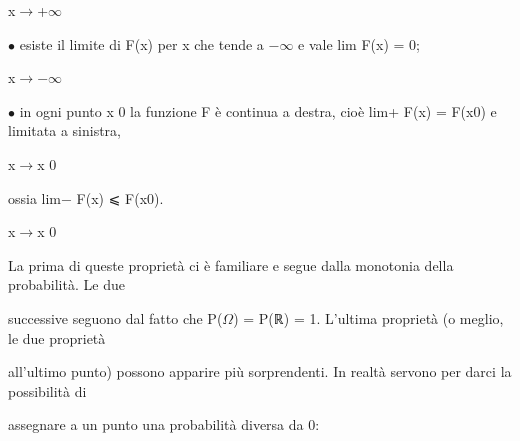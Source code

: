 \documentclass[a4paper,portrait,12pt]{article}
\begin{document}
\begin{flushleft}
x$\rightarrow$+$\infty$
\end{flushleft}





\begin{flushleft}
$\bullet$ esiste il limite di F(x) per x che tende a $-$$\infty$ e vale lim F(x) = 0;
\end{flushleft}


\begin{flushleft}
x$\rightarrow$$-$$\infty$
\end{flushleft}





\begin{flushleft}
$\bullet$ in ogni punto x 0 la funzione F \`{e} continua a destra, cio\`{e} lim+ F(x) = F(x0) e limitata a sinistra,
\end{flushleft}


\begin{flushleft}
x$\rightarrow$x 0
\end{flushleft}


\begin{flushleft}
ossia lim$-$ F(x) ⩽ F(x0).
\end{flushleft}


\begin{flushleft}
x$\rightarrow$x 0
\end{flushleft}





\begin{flushleft}
La prima di queste propriet\`{a} ci \`{e} familiare e segue dalla monotonia della probabilit\`{a}. Le due
\end{flushleft}


\begin{flushleft}
successive seguono dal fatto che P($\Omega$) = P(ℝ) = 1. L'ultima propriet\`{a} (o meglio, le due propriet\`{a}
\end{flushleft}


\begin{flushleft}
all'ultimo punto) possono apparire più sorprendenti. In realt\`{a} servono per darci la possibilit\`{a} di
\end{flushleft}


\begin{flushleft}
assegnare a un punto una probabilit\`{a} diversa da 0:
\end{flushleft}
\end{document}

